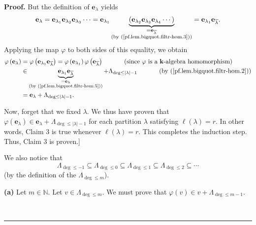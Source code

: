 \documentclass[numbers=enddot,12pt,final,onecolumn,notitlepage]{scrartcl}%
\theoremstyle{definition}
\newenvironment{proof}[1][Proof]{\noindent\textbf{#1.} }{\ \rule{0.5em}{0.5em}}
\begin{document}
\begin{proof}
But the definition of $\mathbf{e}_{\lambda}$ yields
\begin{equation}
\mathbf{e}_{\lambda}=\mathbf{e}_{\lambda_{1}}\mathbf{e}_{\lambda_{2}%
}\mathbf{e}_{\lambda_{3}}\cdots=\mathbf{e}_{\lambda_{1}}\underbrace{\left(
\mathbf{e}_{\lambda_{2}}\mathbf{e}_{\lambda_{3}}\mathbf{e}_{\lambda_{4}}%
\cdots\right)  }_{\substack{=\mathbf{e}_{\overline{\lambda}}\\\text{(by
(\ref{pf.lem.bigquot.filtr-hom.3}))}}}=\mathbf{e}_{\lambda_{1}}\mathbf{e}%
_{\overline{\lambda}}. \label{pf.lem.bigquot.filtr-hom.5}%
\end{equation}
Applying the map $\varphi$ to both sides of this equality, we obtain%
\begin{align*}
\varphi\left(  \mathbf{e}_{\lambda}\right)   &  =\varphi\left(  \mathbf{e}%
_{\lambda_{1}}\mathbf{e}_{\overline{\lambda}}\right)  =\varphi\left(
\mathbf{e}_{\lambda_{1}}\right)  \varphi\left(  \mathbf{e}_{\overline{\lambda
}}\right)  \ \ \ \ \ \ \ \ \ \ \left(  \text{since }\varphi\text{ is a
}\mathbf{k}\text{-algebra homomorphism}\right) \\
&  \in\underbrace{\mathbf{e}_{\lambda_{1}}\mathbf{e}_{\overline{\lambda}}%
}_{\substack{=\mathbf{e}_{\lambda}\\\text{(by
(\ref{pf.lem.bigquot.filtr-hom.5}))}}}+\Lambda_{\deg\leq\left\vert
\lambda\right\vert -1}\ \ \ \ \ \ \ \ \ \ \left(  \text{by
(\ref{pf.lem.bigquot.filtr-hom.2})}\right) \\
&  =\mathbf{e}_{\lambda}+\Lambda_{\deg\leq\left\vert \lambda\right\vert -1}.
\end{align*}


Now, forget that we fixed $\lambda$. We thus have proven that $\varphi\left(
\mathbf{e}_{\lambda}\right)  \in\mathbf{e}_{\lambda}+\Lambda_{\deg
\leq\left\vert \lambda\right\vert -1}$ for each partition $\lambda$ satisfying
$\ell\left(  \lambda\right)  =r$. In other words, Claim 3 is true whenever
$\ell\left(  \lambda\right)  =r$. This completes the induction step. Thus,
Claim 3 is proven.]

We also notice that%
\begin{equation}
\Lambda_{\deg\leq-1}\subseteq\Lambda_{\deg\leq0}\subseteq\Lambda_{\deg\leq
1}\subseteq\Lambda_{\deg\leq2}\subseteq\cdots
\label{pf.lem.bigquot.filtr-hom.filt}%
\end{equation}
(by the definition of the $\Lambda_{\deg\leq m}$).

\textbf{(a)} Let $m\in\mathbb{N}$. Let $v\in\Lambda_{\deg\leq m}$. We must
prove that $\varphi\left(  v\right)  \in v+\Lambda_{\deg\leq m-1}$.


\end{proof}
\end{document}
